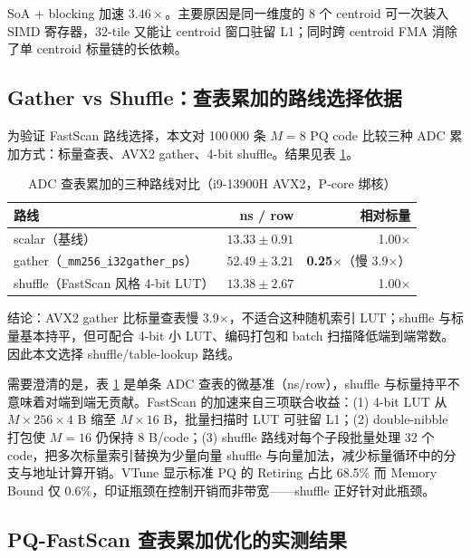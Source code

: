 \documentclass[a4paper,11pt,UTF8]{ctexart}
\begin{document}
SoA + blocking 加速 $3.46\times$。主要原因是同一维度的 8 个 centroid 可一次装入 SIMD 寄存器，$32$-tile 又能让 centroid 窗口驻留 L1；同时跨 centroid FMA 消除了单 centroid 标量链的长依赖。

\subsection{Gather vs Shuffle：查表累加的路线选择依据}
\label{sec:gather_vs_shuffle}

为验证 FastScan 路线选择，本文对 100\,000 条 $M=8$ PQ code 比较三种 ADC 累加方式：标量查表、AVX2 gather、4-bit shuffle。结果见表 \ref{tab:gather_vs_shuffle}。

\begin{table}[H]
  \centering\small
  \begin{tabular}{lrr}
    \toprule
    路线 & ns / row & 相对标量 \\
    \midrule
    scalar（基线） & $13.33 \pm 0.91$ & 1.00$\times$ \\
    gather（\texttt{\_mm256\_i32gather\_ps}） & $52.49 \pm 3.21$ & \textbf{0.25}$\times$（慢 3.9$\times$） \\
    shuffle（FastScan 风格 4-bit LUT） & $13.38 \pm 2.67$ & 1.00$\times$ \\
    \bottomrule
  \end{tabular}
  \caption{ADC 查表累加的三种路线对比（i9-13900H AVX2，P-core 绑核）}
  \label{tab:gather_vs_shuffle}
\end{table}

结论：AVX2 gather 比标量查表慢 3.9$\times$，不适合这种随机索引 LUT；shuffle 与标量基本持平，但可配合 4-bit 小 LUT、编码打包和 batch 扫描降低端到端常数。因此本文选择 shuffle/table-lookup 路线。

需要澄清的是，表 \ref{tab:gather_vs_shuffle} 是单条 ADC 查表的微基准（ns/row），shuffle 与标量持平不意味着对端到端无贡献。FastScan 的加速来自三项联合收益：(1) 4-bit LUT 从 $M\times 256\times 4$ B 缩至 $M\times 16$ B，批量扫描时 LUT 可驻留 L1；(2) double-nibble 打包使 $M=16$ 仍保持 8 B/code；(3) shuffle 路线对每个子段批量处理 32 个 code，把多次标量索引替换为少量向量 shuffle 与向量加法，减少标量循环中的分支与地址计算开销。VTune 显示标准 PQ 的 Retiring 占比 68.5\% 而 Memory Bound 仅 0.6\%，印证瓶颈在控制开销而非带宽——shuffle 正好针对此瓶颈。

\subsection{PQ-FastScan 查表累加优化的实测结果}
\label{sec:fastscan_results}
\end{document}
